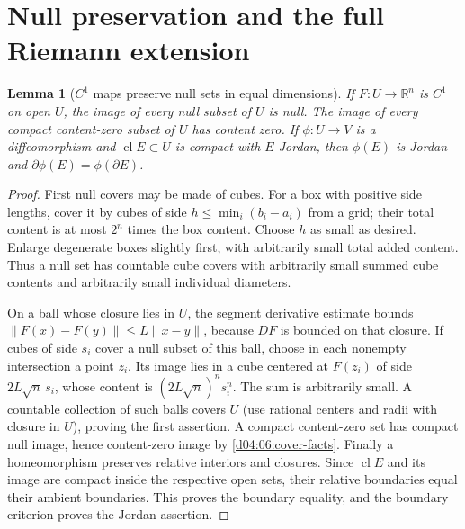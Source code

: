 \documentclass[11pt,oneside,openany]{book}
\newtheorem{lemma}[theorem]{Lemma}
\theoremstyle{definition}
\theoremstyle{remark}
\newcommand{\R}{\mathbb R}
\newcommand{\norm}[1]{\lVert#1\rVert}
\DeclareMathOperator{\cl}{cl}
\newcommand{\family}[1]{}
\begin{document}
\section{Null preservation and the full Riemann extension}
\family{K04.07.03}
\begin{lemma}[$C^1$ maps preserve null sets in equal dimensions]\label{d04:07:null-preservation}
If $F:U\to\R^n$ is $C^1$ on open $U$, the image of every null subset of $U$ is null. The image of every compact content-zero subset of $U$ has content zero. If $\phi:U\to V$ is a diffeomorphism and $\cl E\subset U$ is compact with $E$ Jordan, then $\phi(E)$ is Jordan and $\partial\phi(E)=\phi(\partial E)$.
\end{lemma}
\begin{proof}
First null covers may be made of cubes. For a box with positive side lengths, cover it by cubes of side $h\leq\min_i(b_i-a_i)$ from a grid; their total content is at most $2^n$ times the box content. Choose $h$ as small as desired. Enlarge degenerate boxes slightly first, with arbitrarily small total added content. Thus a null set has countable cube covers with arbitrarily small summed cube contents and arbitrarily small individual diameters.

On a ball whose closure lies in $U$, the segment derivative estimate bounds $\norm{F(x)-F(y)}\leq L\norm{x-y}$, because $DF$ is bounded on that closure. If cubes of side $s_i$ cover a null subset of this ball, choose in each nonempty intersection a point $z_i$. Its image lies in a cube centered at $F(z_i)$ of side $2L\sqrt n\,s_i$, whose content is $(2L\sqrt n)^n s_i^n$. The sum is arbitrarily small. A countable collection of such balls covers $U$ (use rational centers and radii with closure in $U$), proving the first assertion. A compact content-zero set has compact null image, hence content-zero image by \cref{d04:06:cover-facts}. Finally a homeomorphism preserves relative interiors and closures. Since $\cl E$ and its image are compact inside the respective open sets, their relative boundaries equal their ambient boundaries. This proves the boundary equality, and the boundary criterion proves the Jordan assertion.
\end{proof}
\end{document}
